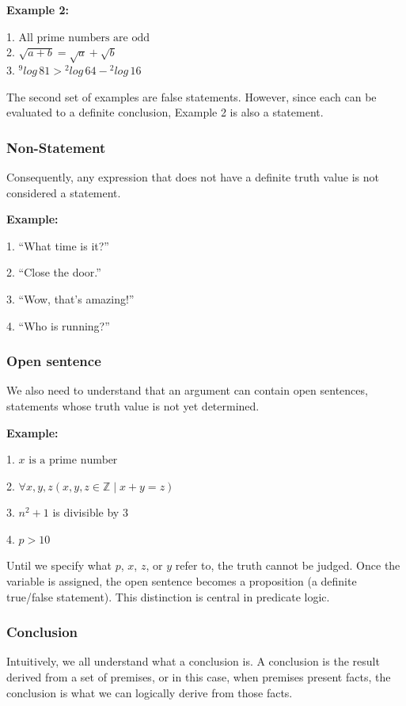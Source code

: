 \documentclass[12pt,a4paper,openany]{article}
\begin{document}
\textbf{Example 2:}

1. $ \text{All prime numbers are odd}$\\

2. $\sqrt{a+b}  = \sqrt{a} + \sqrt{b} $\\

3. ${}^{9}\!log\,81 > {}^{2}\!log\,64 - {}^{2}\!log\,16$


The second set of examples are false statements. However, since each can be evaluated to a definite conclusion, Example 2 is also a statement.


\subsubsection{Non-Statement}

Consequently, any expression that does not have a definite truth value is not considered a statement.

\textbf{Example:}

1. “What time is it?”

2. “Close the door.”

3. “Wow, that’s amazing!”

4. “Who is running?”


\subsubsection {Open sentence} 

We also need to understand that an argument can contain open sentences, statements whose truth value is not yet determined.  

\textbf{Example:}  

1. $ x \text{ is a prime number}$  

2. $ \forall x, y, z (x, y, z \in \mathbb{Z} \mid x +y = z)$

3. $ n^2 + 1$ is divisible by $3$

4. $ p > 10$


Until we specify what $p$, $x$, $z$, or $y$ refer to, the truth cannot be judged. Once the variable is assigned, the open sentence becomes a proposition (a definite true/false statement). This distinction is central in predicate logic. 

\subsubsection{Conclusion}

Intuitively, we all understand what a conclusion is. A conclusion is the result derived from a set of premises, or in this case, when premises present facts, the conclusion is what we can logically derive from those facts.
\end{document}
